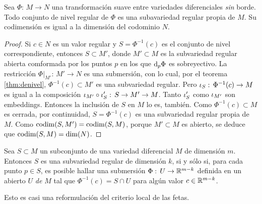 \begin{coroDelValorRegular}%
	\label{thm:delvalorregular}
	Sea $\Phi:\,M\rightarrow N$ una transformaci\'{o}n suave entre
	variedades diferenciales \emph{sin} borde. Todo conjunto de nivel
	regular de $\Phi$ es una subavariedad regular propia de $M$.
	Su codimensi\'{o}n es igual a la dimensi\'{o}n del codominio $N$.
\end{coroDelValorRegular}

\begin{proof}
	Si $c\in N$ es un valor regular y $S=\Phi^{-1}(c)$ es el conjunto de
	nivel correspondiente, entonces $S\subset M'$, donde
	$M'\subset M$ es la subvariedad regular abierta comformada por los
	puntos $p$ en los que $\diferencial[p]{\Phi}$ es sobreyectivo.
	La restricci\'{o}n $\Phi|_{M'}:\,M'\rightarrow N$ es una
	submersi\'{o}n, con lo cual, por el teorema \ref{thm:denivel},
	$\Phi^{-1}(c)\subset M'$ es una subvariedad regular. Pero
	$\inc[S]:\,\Phi^{-1}(c)\rightarrow M$ es igual a la composici\'{o}n
	$\inc[M']\circ\inc[S]':\,S\rightarrow M'\rightarrow M$. Tanto
	$\inc[S]'$ como $\inc[M']$ son embeddings. Entonces la inclusi\'{o}n
	de $S$ en $M$ lo es, tambi\'{e}n. Como $\Phi^{-1}(c)\subset M$ es
	cerrada, por continuidad, $S=\Phi^{-1}(c)$ es una subvariedad regular
	propia de $M$. Como $\codim(S,M')=\codim(S,M)$, porque
	$M'\subset M$ es abierto, se deduce que $\codim(S,M)=\dim(N)$.
\end{proof}

\begin{propoRegularEsLocalmenteDeNivel}\label{thm:regulardenivel}
	Sea $S\subset M$ un subconjunto de una variedad diferencial $M$ de
	dimensi\'{o}n $m$. Entonces $S$ es una subvariedad regular de
	dimensi\'{o}n $k$, si y s\'{o}lo si, para cada punto $p\in S$,
	es posible hallar una submersi\'{o}n $\Phi:\,U\rightarrow\bb{R}^{m-k}$
	definida en un abierto $U$ \emph{de $M$} tal que
	$\Phi^{-1}(c)=S\cap U$ para alg\'{u}n valor $c\in\bb{R}^{m-k}$.
\end{propoRegularEsLocalmenteDeNivel}

Esto es casi una reformulaci\'{o}n del criterio local de las fetas.

